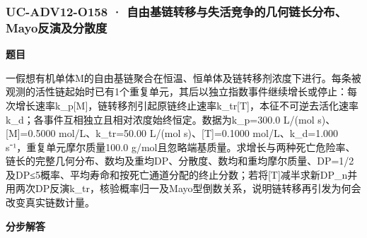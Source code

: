 \documentclass[UTF8,11pt,a4paper]{ctexart}
\begin{document}
\subsubsection*{UC-ADV12-O158 · 自由基链转移与失活竞争的几何链长分布、Mayo反演及分散度}
\noindent\textbf{题目}\par
一假想有机单体M的自由基链聚合在恒温、恒单体及链转移剂浓度下进行。每条被观测的活性链起始时已有1个重复单元，其后以独立指数事件继续增长或停止：每次增长速率k\_p[M]，链转移剂引起原链终止速率k\_tr[T]，本征不可逆去活化速率k\_d；各事件互相独立且相对浓度始终恒定。数据为k\_p=300.0 L/(mol s)、[M]=0.5000 mol/L、k\_tr=50.00 L/(mol s)、[T]=0.1000 mol/L、k\_d=1.000 s⁻¹，重复单元摩尔质量100.0 g/mol且忽略端基质量。求增长与两种死亡危险率、链长的完整几何分布、数均及重均DP、分散度、数均和重均摩尔质量、DP=1/2及DP≤5概率、平均寿命和按死亡通道分配的终止分数；若将[T]减半求新DP\_n并用两次DP反演k\_tr，核验概率归一及Mayo型倒数关系，说明链转移再引发为何会改变真实链数计量。\par
\medskip\noindent\textbf{分步解答}
\end{document}
